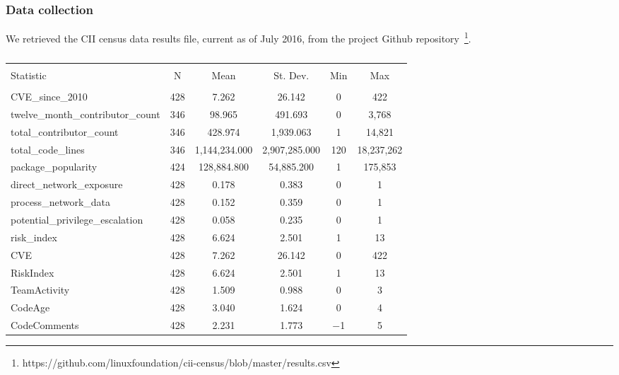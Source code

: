 \subsubsection{Data collection}

We retrieved the CII census data results file, current as of July 2016, from the project Github repository~\footnote{https://github.com/linuxfoundation/cii-census/blob/master/results.csv}. 


\begin{table}[!htbp] \centering 
	\caption{} 
	\label{} 
	\begin{small}
	\begin{tabular}{@{\extracolsep{5pt}}lccccc} 
		\\[-1.8ex]\hline 
		\hline \\[-1.8ex] 
		Statistic & \multicolumn{1}{c}{N} & \multicolumn{1}{c}{Mean} & \multicolumn{1}{c}{St. Dev.} & \multicolumn{1}{c}{Min} & \multicolumn{1}{c}{Max} \\ 
		\hline \\[-1.8ex] 
		CVE\_since\_2010 & 428 & 7.262 & 26.142 & 0 & 422 \\ 
		twelve\_month\_contributor\_count & 346 & 98.965 & 491.693 & 0 & 3,768 \\ 
		total\_contributor\_count & 346 & 428.974 & 1,939.063 & 1 & 14,821 \\ 
		total\_code\_lines & 346 & 1,144,234.000 & 2,907,285.000 & 120 & 18,237,262 \\ 
		package\_popularity & 424 & 128,884.800 & 54,885.200 & 1 & 175,853 \\ 
		direct\_network\_exposure & 428 & 0.178 & 0.383 & 0 & 1 \\ 
		process\_network\_data & 428 & 0.152 & 0.359 & 0 & 1 \\ 
		potential\_privilege\_escalation & 428 & 0.058 & 0.235 & 0 & 1 \\ 
		risk\_index & 428 & 6.624 & 2.501 & 1 & 13 \\ 
		CVE & 428 & 7.262 & 26.142 & 0 & 422 \\ 
		RiskIndex & 428 & 6.624 & 2.501 & 1 & 13 \\ 
		TeamActivity & 428 & 1.509 & 0.988 & 0 & 3 \\ 
		CodeAge & 428 & 3.040 & 1.624 & 0 & 4 \\ 
		CodeComments & 428 & 2.231 & 1.773 & $-$1 & 5 \\ 

\end{tabular}
\end{small}
\end{table}
